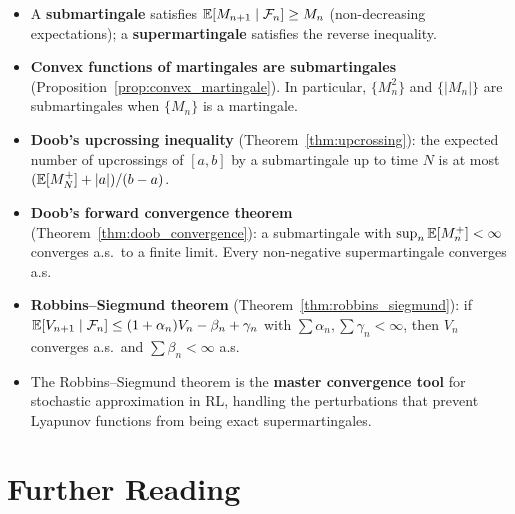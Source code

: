 \documentclass[11pt,a4paper]{article}
\begin{document}
\begin{itemize}[nosep]
  \item A \textbf{submartingale} satisfies
    $\mathbb{E}[M_{n+1} \mid \mathcal{F}_n] \geq M_n$
    (non-decreasing expectations); a \textbf{supermartingale}
    satisfies the reverse inequality.
  \item \textbf{Convex functions of martingales are
    submartingales} (Proposition~\ref{prop:convex_martingale}).
    In particular, $\{M_n^2\}$ and $\{|M_n|\}$ are
    submartingales when $\{M_n\}$ is a martingale.
  \item \textbf{Doob's upcrossing inequality}
    (Theorem~\ref{thm:upcrossing}): the expected number of
    upcrossings of $[a,b]$ by a submartingale up to time $N$ is
    at most $(\mathbb{E}[M_N^+] + |a|)/(b-a)$.
  \item \textbf{Doob's forward convergence theorem}
    (Theorem~\ref{thm:doob_convergence}): a submartingale with
    $\sup_n \mathbb{E}[M_n^+] < \infty$ converges a.s.\ to a finite
    limit.  Every non-negative supermartingale converges a.s.
  \item \textbf{Robbins--Siegmund theorem}
    (Theorem~\ref{thm:robbins_siegmund}): if
    $\mathbb{E}[V_{n+1} \mid \mathcal{F}_n] \leq (1+\alpha_n) V_n
    - \beta_n + \gamma_n$ with $\sum \alpha_n, \sum \gamma_n
    < \infty$, then $V_n$ converges a.s.\ and
    $\sum \beta_n < \infty$ a.s.
  \item The Robbins--Siegmund theorem is the \textbf{master
    convergence tool} for stochastic approximation in RL,
    handling the perturbations that prevent Lyapunov functions
    from being exact supermartingales.
\end{itemize}


\section{Further Reading}
\label{sec:further_reading}
\end{document}
